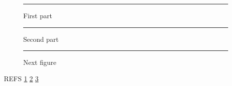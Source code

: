 \documentclass{article}
\begin{document}
\listoffigures
\begin{figure}[h]\centering\rule{2cm}{1cm}\caption{First part}\label{c1}\end{figure}
\begin{figure}[h]\ContinuedFloat\centering\rule{2cm}{1cm}\caption{Second part}\label{c2}\end{figure}
\begin{figure}[h]\centering\rule{2cm}{1cm}\caption{Next figure}\label{c3}\end{figure}
REFS \ref{c1} \ref{c2} \ref{c3}
\end{document}
